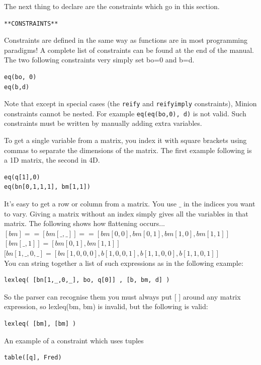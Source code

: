 \documentclass[oneside]{book}
\begin{document}
The next thing to declare are the constraints which go in  this section.
\begin{verbatim}
**CONSTRAINTS**
\end{verbatim}

Constraints are defined in the same way as functions are in most programming paradigms!  A complete list of constraints can be found at the end of  the manual. The two following constraints very simply set bo=0 and b=d.
\begin{verbatim}
eq(bo, 0)
eq(b,d)
\end{verbatim}

Note that except in special cases (the \texttt{reify} and \texttt{reifyimply} constraints), Minion constraints cannot be nested. For example \texttt{eq(eq(bo,0), d)} is not valid. Such constraints must be written by manually adding extra variables.

To get a single variable from a matrix, you index it with square brackets using
commas to separate the dimensions of the matrix. The first example following
is a 1D matrix, the second in 4D. 
\begin{verbatim}
eq(q[1],0)
eq(bn[0,1,1,1], bm[1,1])
\end{verbatim}

It's easy to get a row or column from a matrix.  You use $\_$ in the indices you want to vary.  Giving a matrix without an index simply gives all the variables in that matrix. The following shows how flattening occurs...\\
$[bm] == [ bm[\_,\_] ] == [ bm[0,0], bm[0,1], bm[1,0], bm[1,1] ]$\\
$[ bm[\_,1] ] = [ bm[0,1], bm[1,1] ]$\\
$[ bn[1,\_,0,\_] = [ bn[1,0,0,0], b[1,0,0,1], b[1,1,0,0], b[1,1,0,1] ]$\\

You can string together a list of such expressions as in the following example:
\begin{verbatim}
lexleq( [bn[1,_,0,_], bo, q[0]] , [b, bm, d] )
\end{verbatim}

So the parser can recognise them you must always put [ ] around any matrix expression, so lexleq(bm, bm) is invalid, but the following is valid:
\begin{verbatim}
lexleq( [bm], [bm] )
\end{verbatim}

An example of a constraint which uses tuples
\begin{verbatim}
table([q], Fred)
\end{verbatim}
\end{document}
